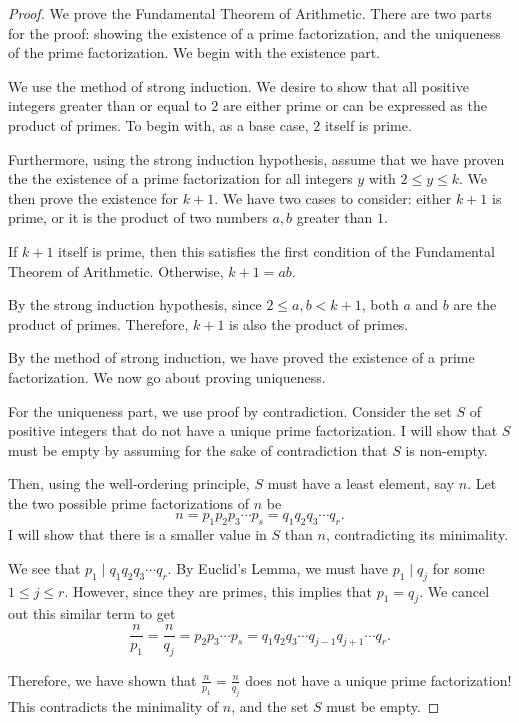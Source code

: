 \begin{proof} We prove the Fundamental Theorem of Arithmetic. There are two parts for the proof: showing the existence of a prime factorization, and the uniqueness of the prime factorization. We begin with the \color{blue} existence part.  
	
\clearpage
	
\color{black} We use the method of strong induction. We desire to show that all positive integers greater than or equal to $2$ are either prime or can be expressed as the product of primes. To begin with, as a \color{ForestGreen} base case, \color{black} $2$ itself is prime. 

Furthermore, using the \color{ForestGreen} strong induction hypothesis, \color{black} assume that we have proven the the existence of a prime factorization for all integers $y$ with $2\le y\le k$. We then prove the existence for $k+1$. We have two cases to consider: either $k+1$ is prime, or it is the product of two numbers $a,b$ greater than $1$.

If $k+1$ itself is prime, then this satisfies the first condition of the Fundamental Theorem of Arithmetic. Otherwise, $k+1=ab$. 

By the strong induction hypothesis, since $2\le a,b<k+1$, \color{black} both $a$ and $b$ are the product of primes. Therefore, $k+1$ is also the product of primes.

By the method of strong induction, we have proved the existence of a prime factorization. We now go about proving uniqueness. 

For the \color{blue} uniqueness part\color{black}, we use proof by contradiction. Consider the set $S$ of positive integers that do not have a unique prime factorization. I will show that $S$ must be empty by assuming for the sake of contradiction that $S$ is non-empty.

Then, using the well-ordering principle, $S$ must have a least element, say $n$. Let the two possible prime factorizations of $n$ be $$n=p_1p_2p_3\cdots p_s=q_1q_2q_3\cdots q_r.$$ I will show that there is a smaller value in $S$ than $n$, contradicting its minimality.  

We see that $p_1\mid q_1q_2q_3\cdots q_r$. By Euclid's Lemma, we must have $p_1\mid q_j$ for some $1\le j\le r$. However, since they are primes, this implies that $p_1=q_j$. We cancel out this similar term to get $$\frac{n}{p_1}=\frac{n}{q_j}=p_2p_3\cdots p_s=q_1q_2q_3\cdots q_{j-1}q_{j+1}\cdots q_r.$$ 

Therefore, we have shown that $\frac{n}{p_1}=\frac{n}{q_j}$ does not have a unique prime factorization! This contradicts the minimality of $n$, and the set $S$ must be empty.  \end{proof}

